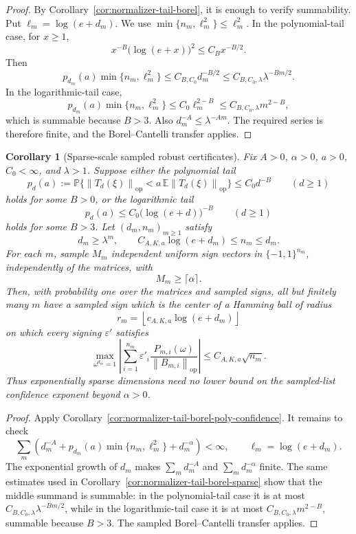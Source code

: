 \documentclass[11pt]{amsart}
\numberwithin{equation}{section}
\newtheorem{corollary}[theorem]{Corollary}
\theoremstyle{definition}
\theoremstyle{remark}
\newcommand{\op}{\mathrm{op}}
\newcommand{\Prob}{\mathbb P}
\newcommand{\Exp}{\mathbb E}
\newcommand{\norm}[1]{\left\lVert #1\right\rVert}
\newcommand{\eps}{\varepsilon}
\begin{document}
\begin{proof}
By Corollary~\ref{cor:normalizer-tail-borel}, it is enough to verify
summability.  Put \(\ell_m=\log(e+d_m)\).  We use
\(\min\{n_m,\ell_m^2\}\le \ell_m^2\).  In the polynomial-tail case, for
\(x\ge1\),
\[
  x^{-B}\bigl(\log(e+x)\bigr)^2\le C_Bx^{-B/2}.
\]
Then
\[
  p_{d_m}(a)\min\{n_m,\ell_m^2\}
  \le C_{B,C_0}d_m^{-B/2}
  \le C_{B,C_0,\lambda}\lambda^{-Bm/2}.
\]
In the logarithmic-tail case,
\[
  p_{d_m}(a)\min\{n_m,\ell_m^2\}
  \le C_0\ell_m^{2-B}
  \le C_{B,C_0,\lambda}m^{2-B},
\]
which is summable because \(B>3\).
Also \(d_m^{-A}\le \lambda^{-Am}\).  The required series is therefore finite,
and the Borel--Cantelli transfer applies.
\end{proof}

\begin{corollary}[Sparse-scale sampled robust certificates]
\label{cor:normalizer-tail-borel-sparse-sampled}
Fix \(A>0\), \(\alpha>0\), \(a>0\), \(C_0<\infty\), and \(\lambda>1\).
Suppose either the polynomial tail
\[
  p_d(a):=\Prob\{\norm{T_d(\xi)}_{\op}<a\,\Exp\norm{T_d(\xi)}_{\op}\}
  \le C_0d^{-B}
  \qquad(d\ge1)
\]
holds for some \(B>0\), or the logarithmic tail
\[
  p_d(a)\le C_0\bigl(\log(e+d)\bigr)^{-B}
  \qquad(d\ge1)
\]
holds for some \(B>3\).
Let \((d_m,n_m)_{m\ge1}\) satisfy
\[
  d_m\ge \lambda^m,\qquad
  C_{A,K,a}\log(e+d_m)\le n_m\le d_m .
\]
For each \(m\), sample \(M_m\) independent uniform sign vectors in
\(\{-1,1\}^{n_m}\), independently of the matrices, with
\[
  M_m\ge\lceil\alpha\rceil .
\]
Then, with probability one over the matrices and sampled signs, all but
finitely many \(m\) have a sampled sign which is the center of a Hamming ball of
radius
\[
  r_m=\left\lfloor c_{A,K,a}\log(e+d_m)\right\rfloor
\]
on which every signing \(\eps'\) satisfies
\[
  \max_{\omega^{d_m}=1}\left|\sum_{i=1}^{n_m}
  \eps'_i\frac{P_{m,i}(\omega)}{\norm{B_{m,i}}_{\op}}\right|
  \le C_{A,K,a}\sqrt{n_m}.
\]
Thus exponentially sparse dimensions need no lower bound on the sampled-list
confidence exponent beyond \(\alpha>0\).
\end{corollary}

\begin{proof}
Apply Corollary~\ref{cor:normalizer-tail-borel-poly-confidence}.  It remains to
check
\[
  \sum_m\left(d_m^{-A}
  +p_{d_m}(a)\min\{n_m,\ell_m^2\}
  +d_m^{-\alpha}\right)<\infty,
  \qquad \ell_m=\log(e+d_m).
\]
The exponential growth of \(d_m\) makes \(\sum_m d_m^{-A}\) and
\(\sum_m d_m^{-\alpha}\) finite.  The same estimates used in
Corollary~\ref{cor:normalizer-tail-borel-sparse} show that the middle summand is
summable: in the polynomial-tail case it is at most
\(C_{B,C_0,\lambda}\lambda^{-Bm/2}\), while in the logarithmic-tail case it is
at most \(C_{B,C_0,\lambda}m^{2-B}\), summable because \(B>3\).  The sampled
Borel--Cantelli transfer applies.
\end{proof}
\end{document}
